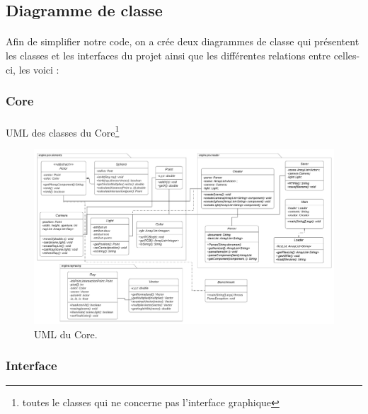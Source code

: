 \documentclass[12pt]{article}
\begin{document}
		\subsection{Diagramme de classe}
		\paragraph{}Afin de simplifier notre code, on a crée deux diagrammes de classe qui présentent les classes et les interfaces du projet ainsi que les différentes relations entre celles-ci, les voici :
		
			\subsubsection{Core}
			\paragraph{}UML des classes du Core\footnote{toutes le classes qui ne concerne pas l'interface graphique}
			    \begin{figure}[h]
                    \begin{center}
                    \includegraphics[width=1.1\textwidth]{./images/Core.png}
                    \end{center}
                    \caption{UML du Core.}
                    \label{fig}
                \end{figure}
            \newpage
			\subsubsection{Interface}
\end{document}
